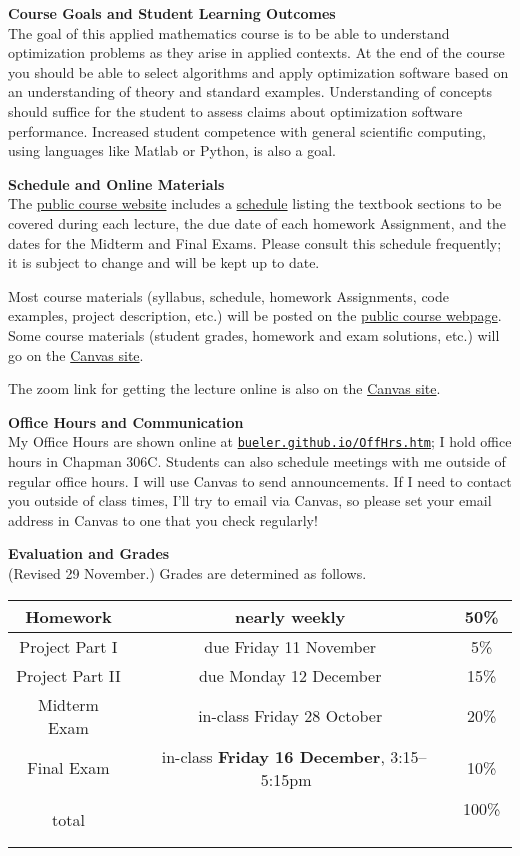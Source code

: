 \documentclass[12pt]{article}
\renewcommand{\emph}[1]{\textsf{\textbf{#1}}}
\newcommand{\localhead}[1]{\par\smallskip\textbf{#1} \smallskip\nobreak\\}%
\def\heading#1{\localhead{\large\emph{#1}}}
\begin{document}
\heading{Course Goals and Student Learning Outcomes}
The goal of this applied mathematics course is to be able to understand optimization problems as they arise in applied contexts.  At the end of the course you should be able to select algorithms and apply optimization software based on an understanding of theory and standard examples.  Understanding of concepts should suffice for the student to assess claims about optimization software performance.  Increased student competence with general scientific computing, using languages like Matlab or Python, is also a goal.


\heading{Schedule and Online Materials}
The \href{https://bueler.github.io/opt/}{public course website} includes a \href{https://bueler.github.io/opt/assets/general/schedule.pdf}{schedule} listing the textbook sections to be covered during each lecture, the due date of each homework Assignment, and the dates for the Midterm and Final Exams.  Please consult this schedule frequently; it is subject to change and will be kept up to date.

Most course materials (syllabus, schedule, homework Assignments, code examples, project description, etc.) will be posted on the \href{https://bueler.github.io/opt/}{public course webpage}.  Some course materials (student grades, homework and exam solutions, etc.) will go on the \href{https://canvas.alaska.edu/courses/9948}{Canvas site}.

The zoom link for getting the lecture online is also on the \href{https://canvas.alaska.edu/courses/9948}{Canvas site}.

\heading{Office Hours and Communication}
My Office Hours are shown online at \href{http://bueler.github.io/OffHrs.htm}{\texttt{bueler.github.io/OffHrs.htm}}; I hold office hours in Chapman 306C.  Students can also schedule meetings with me outside of regular office hours.  I will use Canvas to send announcements.  If I need to contact you outside of class times, I'll try to email via Canvas, so please set your email address in Canvas to one that you check regularly!


\heading{Evaluation and Grades}
(Revised 29 November.)  Grades are determined as follows.

\begin{tabular}{|c|c|c|}
\hline
Homework & nearly weekly & 50\% \\
\hline
Project Part I & due Friday 11 November & 5\%  \\
\hline
Project Part II & due Monday 12 December & 15\%  \\
\hline
Midterm Exam & in-class Friday 28 October & 20\%  \\
\hline
Final Exam & \, in-class \emph{Friday 16 December}, 3:15--5:15pm \, & 10\% \\
\hline
total & & 100\% \, \\
\hline
\end{tabular}
\end{document}
